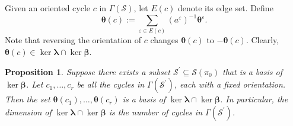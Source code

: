 \documentclass[11pt]{article}
\newcommand{\bbeta}{\boldsymbol{\beta}}
\newcommand{\blambda}{\boldsymbol{\lambda}}
\newcommand{\btheta}{{\boldsymbol{\theta}}}
\newtheorem{proposition}[theorem]{Proposition}%
\theoremstyle{definition}\newtheorem{definition}[theorem]{Definition}
\theoremstyle{definition}\newtheorem{remark}[theorem]{Remark}
\theoremstyle{remark}
\numberwithin{equation}{section}
\begin{document}
Given an oriented cycle $c$ in $\Gamma(\mathcal{S})$, let $E(c)$ denote its edge set. Define
\begin{equation}\label{eq:bthetac}
    \btheta(c) := \sum_{\varepsilon \in E(c)} (a^{\varepsilon})^{-1}\btheta^{\varepsilon}.
\end{equation}
Note that reversing the orientation of $c$ changes $\btheta(c)$ to $-\btheta(c)$. Clearly, $\btheta(c) \in \ker \blambda \cap \ker \bbeta$.

\begin{proposition}\label{p:ker_cycles}
    Suppose there exists a subset $\mathcal{S}^\prime \subseteq \mathcal{S}(\pi_0)$ that is a basis of $\ker \bbeta$. Let $c_1,\ldots,c_r$ be all the cycles in $\Gamma(\mathcal{S}^\prime)$, each with a fixed orientation. Then the set $\btheta(c_1),\ldots,\btheta(c_r)$ is a basis of $\ker \blambda \cap \ker \bbeta$. In particular, the dimension of $\ker \blambda \cap \ker \bbeta$ is the number of cycles in $\Gamma(\mathcal{S}^\prime)$.
\end{proposition}
\end{document}
